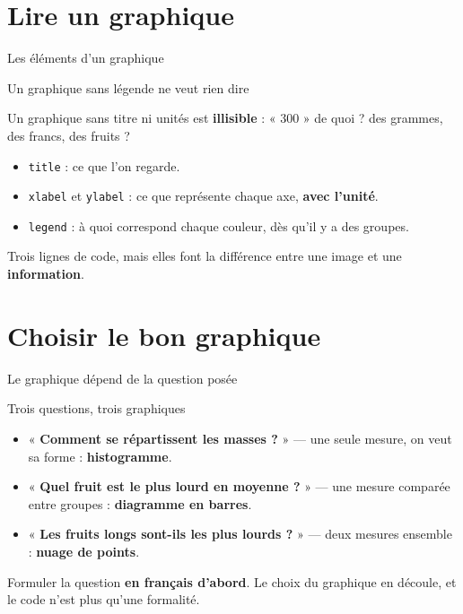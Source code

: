 \documentclass[aspectratio=169,11pt]{beamer}
\begin{document}
\section{Lire un graphique}

\begin{frame}{Les éléments d'un graphique}
\end{frame}

\begin{frame}{Un graphique sans légende ne veut rien dire}
\begin{ucadpiege}
{\small Un graphique sans titre ni unités est \textbf{illisible} : « 300 » de quoi ? des grammes, des francs, des fruits ?}
\end{ucadpiege}
\begin{itemize}\small
  \item \texttt{title} : ce que l'on regarde.
  \item \texttt{xlabel} et \texttt{ylabel} : ce que représente chaque axe, \textbf{avec l'unité}.
  \item \texttt{legend} : à quoi correspond chaque couleur, dès qu'il y a des groupes.
\end{itemize}
{\small Trois lignes de code, mais elles font la différence entre une image et une \textbf{information}.}
\end{frame}

\section{Choisir le bon graphique}

\begin{frame}{Le graphique dépend de la question posée}
\end{frame}

\begin{frame}{Trois questions, trois graphiques}
\begin{itemize}\small
  \item « \textbf{Comment se répartissent les masses ?} » — une seule mesure, on veut sa forme : \textbf{histogramme}.
  \item « \textbf{Quel fruit est le plus lourd en moyenne ?} » — une mesure comparée entre groupes : \textbf{diagramme en barres}.
  \item « \textbf{Les fruits longs sont-ils les plus lourds ?} » — deux mesures ensemble : \textbf{nuage de points}.
\end{itemize}
\begin{ucadret}
{\small Formuler la question \textbf{en français d'abord}. Le choix du graphique en découle, et le code n'est plus qu'une formalité.}
\end{ucadret}
\end{frame}
\end{document}
